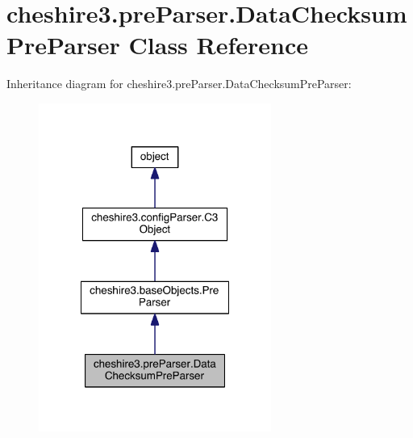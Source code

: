 \hypertarget{classcheshire3_1_1pre_parser_1_1_data_checksum_pre_parser}{\section{cheshire3.\-pre\-Parser.\-Data\-Checksum\-Pre\-Parser Class Reference}
\label{classcheshire3_1_1pre_parser_1_1_data_checksum_pre_parser}
}


Inheritance diagram for cheshire3.\-pre\-Parser.\-Data\-Checksum\-Pre\-Parser\-:
\nopagebreak
\begin{figure}[H]
\begin{center}
\leavevmode
\includegraphics[width=216pt]{classcheshire3_1_1pre_parser_1_1_data_checksum_pre_parser__inherit__graph}
\end{center}
\end{figure}


